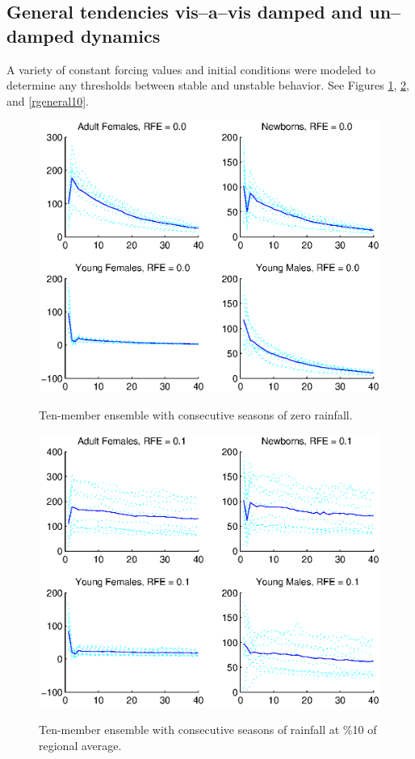 \documentclass[fleqn, letterpaper]{amsart}
\begin{document}
\subsection{General tendencies vis--a--vis damped and un--damped dynamics}
A variety of constant forcing values and initial conditions were modeled to determine any thresholds between stable and unstable behavior.
See Figures \ref{general0}, \ref{rgeneral1}, and \ref{rgeneral10}.
\begin{figure}
\includegraphics[width=\textwidth]{general0}
\label{general0}
\caption{Ten-member ensemble with consecutive seasons of zero rainfall.}
\end{figure}
\begin{figure}
\includegraphics[width=\textwidth]{rgeneral1}
\label{rgeneral1}
\caption{Ten-member ensemble with consecutive seasons of rainfall at \%10 of regional average.}
\end{figure}
\end{document}

